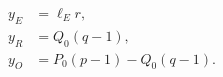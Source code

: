 \documentclass{article}
\begin{document}
\fontsize{22}{29}\selectfont
\[
\begin{aligned} y_E&=\ell_Er,\\ y_R&=Q_0(q-1),\\ y_O&=P_0(p-1)-Q_0(q-1).\end{aligned}
\]
\end{document}
